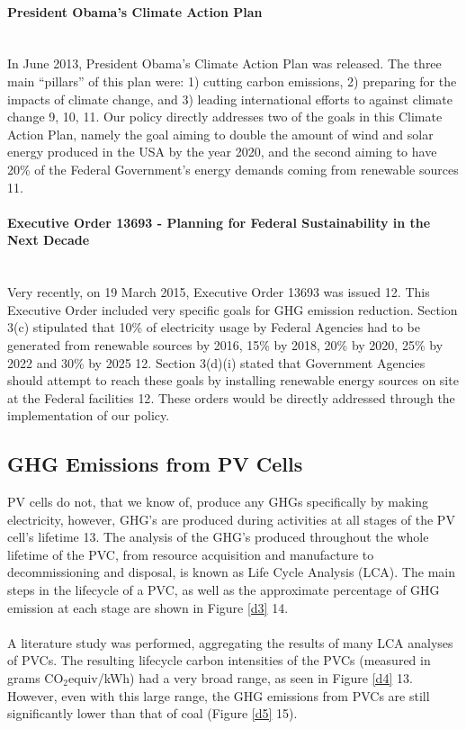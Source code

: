 \paragraph{President Obama's Climate Action Plan} \mbox{ }\\
In June 2013, President Obama’s Climate Action Plan was released. The three main ``pillars'' of this plan were: 1) cutting carbon emissions, 2) preparing for the impacts of climate change, and 3) leading international efforts to against climate change \cite{debbie}{9, 10, 11}. Our policy directly addresses two of the goals in this Climate Action Plan, namely the goal aiming to double the amount of wind and solar energy produced in the USA by the year 2020, and the second aiming to have 20\% of the Federal Government’s energy demands coming from renewable sources \cite{debbie}{11}.

\paragraph{Executive Order 13693 - Planning for Federal Sustainability in the Next Decade} \mbox{ }\\
Very recently, on 19 March 2015, Executive Order 13693 was issued
\cite{debbie}{12}. This Executive Order included very specific goals for GHG emission reduction. Section 3(c) stipulated that 10\% of electricity usage by Federal Agencies had to be generated from renewable sources by 2016, 15\% by 2018, 20\% by 2020, 25\% by 2022 and 30\% by 2025 \cite{debbie}{12}. Section 3(d)(i) stated that Government Agencies should attempt to reach these goals by installing renewable energy sources on site at the Federal facilities \cite{debbie}{12}. These orders would be directly addressed through the implementation of our policy.

\subsection{GHG Emissions from PV Cells}
PV cells do not, that we know of, produce any GHGs specifically by making electricity, however, GHG’s are produced during activities at all stages of the PV cell’s lifetime \cite{debbie}{13}. The analysis of the GHG’s produced throughout the whole lifetime of the PVC, from resource acquisition and manufacture to decommissioning and disposal, is known as Life Cycle Analysis (LCA). The main steps in the lifecycle of a PVC, as well as the approximate percentage of GHG emission at each stage are shown in Figure \ref{d3} \cite{debbie}{14}.
\\\\
\noindent A literature study was performed, aggregating the results of many LCA analyses of PVCs. The resulting lifecycle carbon intensities of the PVCs (measured in grams CO$_{2}$equiv/kWh) had a very broad range, as seen in Figure \ref{d4} \cite{debbie}{13}. However, even with this large range, the GHG emissions from PVCs are still significantly lower than that of coal (Figure \ref{d5} \cite{debbie}{15}).

